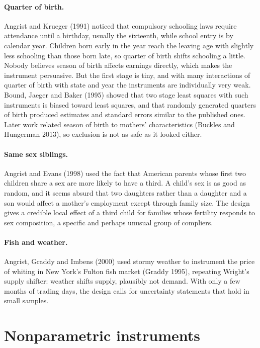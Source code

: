 \paragraph{Quarter of birth.} Angrist and Krueger (1991) noticed that compulsory schooling laws require attendance until a birthday, usually the sixteenth, while school entry is by calendar year. Children born early in the year reach the leaving age with slightly less schooling than those born late, so quarter of birth shifts schooling a little. Nobody believes season of birth affects earnings directly, which makes the instrument persuasive. But the first stage is tiny, and with many interactions of quarter of birth with state and year the instruments are individually very weak. Bound, Jaeger and Baker (1995) showed that two stage least squares with such instruments is biased toward least squares, and that randomly generated quarters of birth produced estimates and standard errors similar to the published ones.  Later work related season of birth to mothers' characteristics (Buckles and Hungerman 2013), so exclusion is not as safe as it looked either.

\paragraph{Same sex siblings.} Angrist and Evans (1998) used the fact that American parents whose first two children share a sex are more likely to have a third. A child's sex is as good as random, and it seems absurd that two daughters rather than a daughter and a son would affect a mother's employment except through family size. The design gives a credible local effect of a third child for families whose fertility responds to sex composition, a specific and perhaps unusual group of compliers.

\paragraph{Fish and weather.} Angrist, Graddy and Imbens (2000) used stormy weather to instrument the price of whiting in New York's Fulton fish market (Graddy 1995), repeating Wright's supply shifter: weather shifts supply, plausibly not demand. With only a few months of trading days, the design calls for uncertainty statements that hold in small samples.

\section{Nonparametric instruments}\label{iv:sec:nonpar}

